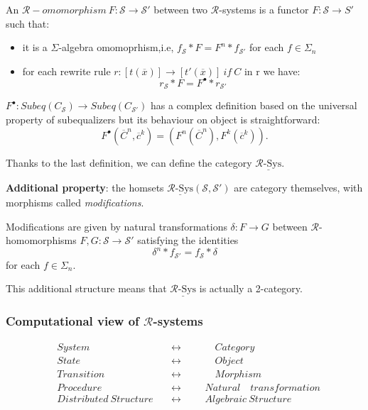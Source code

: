 \documentclass{beamer}
\begin{document}
\begin{frame}
    \scriptsize
    An $\mathcal{R}-omomorphism\ F: \mathcal{S} \rightarrow \mathcal{S}'$ between two $\mathcal{R}$-systems is a 
    functor $F:\mathcal{S} \rightarrow S'$ such that:
    \begin{itemize}
        \item it is a $\Sigma$-algebra omomoprhism,i.e, $f_\mathcal{S}*F = F^n*f_{\mathcal{S}'}$ for each $f \in \Sigma_n$
        \item for each rewrite rule $r:[t(\overline{x})] \rightarrow [t'(\overline{x})]\ if\ C$ in r we have: 
        $$ r_\mathcal{S} * F = F^\bullet * r_{\mathcal{S}'} $$
    \end{itemize}
    $F^\bullet:Subeq(C_\mathcal{S}) \rightarrow Subeq(C_{\mathcal{S}'})$ has  a complex definition based on the universal property of subequalizers 
    but its behaviour on object is straightforward: 
    $$F^\bullet(\overline{C}^n,\overline{c}^k) = (F^n(\overline{C}^n),F^k(\overline{c}^k)). $$

 
    \pause 
    Thanks to the last definition, we can define the category $\underline{\mathcal{R}\text{-Sys}}$. 

    \medskip
    \pause
    \textbf{Additional property}: the homsets $\underline{\mathcal{R}\text{-Sys}}(\mathcal{S},\mathcal{S}')$ are 
    category themselves, with morphisms called \emph{modifications}.

    Modifications are given by natural transformations $\delta: F \rightarrow G$ between $\mathcal{R}$-homomorphisms 
    $F,G:\mathcal{S} \rightarrow \mathcal{S}'$ satisfying the identities
    $$\delta^n * f_{\mathcal{S}'} =  f_\mathcal{S} * \delta$$
    for each $f \in \Sigma_n$. 

    \medskip
    \pause
    This additional structure means that $\underline{\mathcal{R}\text{-Sys}}$ is actually a 2-category.
\end{frame}
\begin{frame}
    \frametitle{Computational view of $\mathcal{R}$-systems}
    \large
    \begin{align*}
        &System \quad &&\leftrightarrow  &&&\quad Category \\
        &State \quad &&\leftrightarrow &&&\quad  Object \\
        &Transition \quad &&\leftrightarrow &&&\quad Morphism \\ 
        &Procedure \quad &&\leftrightarrow &&&Natural \quad transformation \\ 
        &Distributed\ Structure\ &&\leftrightarrow &&& Algebraic\ Structure 
    \end{align*}
\end{frame}
\end{document}
